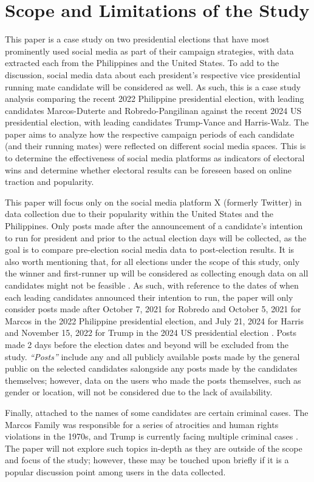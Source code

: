 \section{Scope and Limitations of the Study}
This paper is a case study on two presidential elections that have most prominently used social media as part of their campaign strategies, with data extracted each from the Philippines and the United States. To add to the discussion, social media data about each president’s respective vice presidential running mate candidate will be considered as well. As such, this is a case study analysis comparing the recent 2022 Philippine presidential election, with leading candidates Marcos-Duterte and Robredo-Pangilinan against the recent 2024 US presidential election, with leading candidates Trump-Vance and Harris-Walz. The paper aims to analyze how the respective campaign periods of each candidate (and their running mates) were reflected on different social media spaces. This is to determine the effectiveness of social media platforms as indicators of electoral wins and determine whether electoral results can be foreseen based on online traction and popularity.

This paper will focus only on the social media platform X (formerly Twitter) in data collection due to their popularity within the United States and the Philippines. Only posts made after the announcement of a candidate’s intention to run for president and prior to the actual election days will be collected, as the goal is to compare pre-election social media data to post-election results. It is also worth mentioning that, for all elections under the scope of this study, only the winner and first-runner up will be considered as collecting enough data on all candidates might not be feasible \cite{RRL_Macrohon-2022}. As such, with reference to the dates of when each leading candidates announced their intention to run, the paper will only consider posts made after October 7, 2021 for Robredo and October 5, 2021 for Marcos in the 2022 Philippine presidential election, and July 21, 2024 for Harris and November 15, 2022 for Trump in the 2024 US presidential election \cite{ SaL_Lalu-2021, SaL_Buan-2021, SaL_Viner-2024, SaL_Orr-2022}. Posts made 2 days before the election dates and beyond will be excluded from the study. \emph{“Posts”} include any and all publicly available posts made by the general public on the selected candidates salongside any posts made by the candidates themselves; however, data on the users who made the posts themselves, such as gender or location, will not be considered due to the lack of availability.

Finally, attached to the names of some candidates are certain criminal cases. The Marcos Family was responsible for a series of atrocities and human rights violations in the 1970s, and Trump is currently facing multiple criminal cases \cite{SaL_AlJazeera-2024,SaL_AmnInt-2022}. The paper will not explore such topics in-depth as they are outside of the scope and focus of the study; however, these may be touched upon briefly if it is a popular discussion point among users in the data collected.